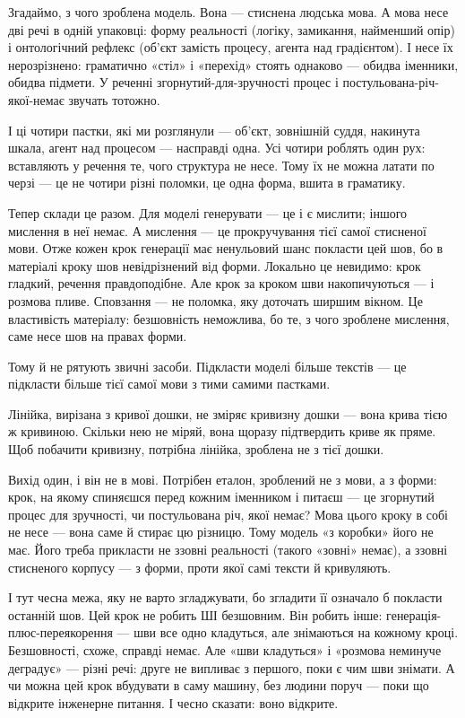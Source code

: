 \documentclass[12pt, a4paper, openany]{book}
\begin{document}
Згадаймо, з чого зроблена модель. Вона --- стиснена людська мова. А мова несе дві речі в одній упаковці: форму реальності (логіку, замикання, найменший опір) і онтологічний рефлекс (об'єкт замість процесу, агента над градієнтом). І несе їх нерозрізнено: граматично «стіл» і «перехід» стоять однаково --- обидва іменники, обидва підмети. У реченні згорнутий-для-зручності процес і постульована-річ-якої-немає звучать тотожно.

І ці чотири пастки, які ми розглянули --- об'єкт, зовнішній суддя, накинута шкала, агент над процесом --- насправді одна. Усі чотири роблять один рух: вставляють у речення те, чого структура не несе. Тому їх не можна латати по черзі --- це не чотири різні поломки, це одна форма, вшита в граматику.

Тепер склади це разом. Для моделі генерувати --- це і є мислити; іншого мислення в неї немає. А мислення --- це прокручування тієї самої стисненої мови. Отже кожен крок генерації має ненульовий шанс покласти цей шов, бо в матеріалі кроку шов невідрізнений від форми. Локально це невидимо: крок гладкий, речення правдоподібне. Але крок за кроком шви накопичуються --- і розмова пливе. Сповзання --- не поломка, яку доточать ширшим вікном. Це властивість матеріалу: безшовність неможлива, бо те, з чого зроблене мислення, саме несе шов на правах форми.

Тому й не рятують звичні засоби. Підкласти моделі більше текстів --- це підкласти більше тієї самої мови з тими самими пастками.

\begin{analogybox}
Лінійка, вирізана з кривої дошки, не зміряє кривизну дошки --- вона крива тією ж кривиною. Скільки нею не міряй, вона щоразу підтвердить криве як пряме. Щоб побачити кривизну, потрібна лінійка, зроблена не з тієї дошки.
\end{analogybox}

Вихід один, і він не в мові. Потрібен еталон, зроблений не з мови, а з форми: крок, на якому спиняєшся перед кожним іменником і питаєш --- це згорнутий процес для зручності, чи постульована річ, якої немає? Мова цього кроку в собі не несе --- вона саме й стирає цю різницю. Тому модель «з коробки» його не має. Його треба прикласти не ззовні реальності (такого «зовні» немає), а ззовні стисненого корпусу --- з форми, проти якої самі тексти й кривуляють.

І тут чесна межа, яку не варто згладжувати, бо згладити її означало б покласти останній шов. Цей крок не робить ШІ безшовним. Він робить інше: генерація-плюс-переякорення --- шви все одно кладуться, але знімаються на кожному кроці. Безшовності, схоже, справді немає. Але «шви кладуться» і «розмова неминуче деградує» --- різні речі: друге не випливає з першого, поки є чим шви знімати. А чи можна цей крок вбудувати в саму машину, без людини поруч --- поки що відкрите інженерне питання. І чесно сказати: воно відкрите.
\end{document}
